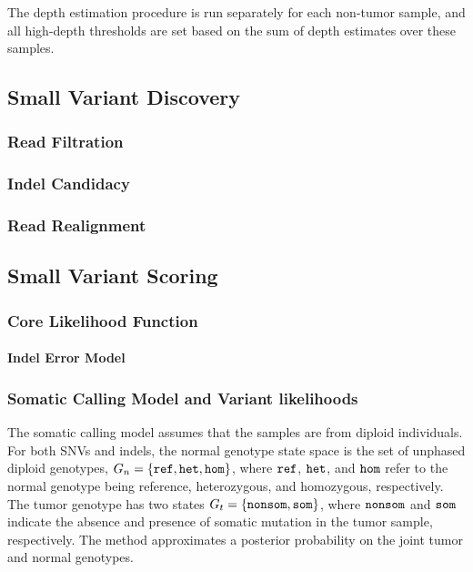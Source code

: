 \documentclass{article}
\begin{document}
The depth estimation procedure is run separately for each non-tumor sample, and all high-depth thresholds are set based on the sum of depth estimates over these samples.

\subsection{Small Variant Discovery}

\subsubsection{Read Filtration}

\subsubsection{Indel Candidacy}

\subsubsection{Read Realignment}

\subsection{Small Variant Scoring}

\subsubsection{Core Likelihood Function}

\paragraph{Indel Error Model}

\subsubsection{Somatic Calling Model and Variant likelihoods}
The somatic calling model assumes that the samples are from diploid individuals. For both SNVs and indels, the normal genotype state space is the set of unphased diploid genotypes, $G_n = \{ \tt{ref}, \tt{het}, \tt{hom}\}$, where $\tt{ref}$, $\tt{het}$, and $\tt{hom}$ refer to the normal genotype being reference, heterozygous, and homozygous, respectively. The tumor genotype has two states $G_t = \{ \tt{nonsom}, \tt{som} \}$, where $\tt{nonsom}$ and $\tt{som}$ indicate the absence and presence of somatic mutation in the tumor sample, respectively. The method approximates a posterior probability on the joint tumor and normal genotypes.
\end{document}
